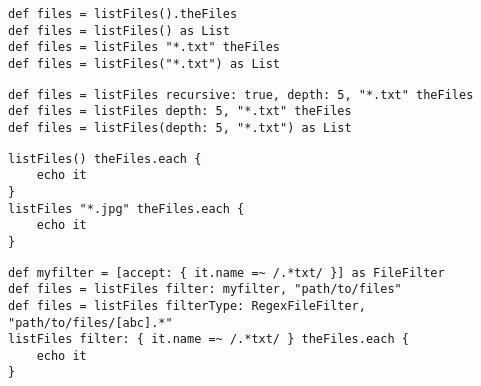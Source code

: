 \begin{lstlisting}[style=Groovybash, label={lst:example_listFiles_simple}]
def files = listFiles().theFiles
def files = listFiles() as List
def files = listFiles "*.txt" theFiles
def files = listFiles("*.txt") as List
\end{lstlisting}

\begin{lstlisting}[style=Groovybash, label={lst:example_listFiles_arguments}]
def files = listFiles recursive: true, depth: 5, "*.txt" theFiles
def files = listFiles depth: 5, "*.txt" theFiles
def files = listFiles(depth: 5, "*.txt") as List
\end{lstlisting}

\begin{lstlisting}[style=Groovybash, label={lst:example_listFiles_iterate}]
listFiles() theFiles.each {
    echo it
}
listFiles "*.jpg" theFiles.each {
    echo it
}
\end{lstlisting}

\begin{lstlisting}[style=Groovybash, label={lst:example_listFiles_filter}]
def myfilter = [accept: { it.name =~ /.*txt/ }] as FileFilter
def files = listFiles filter: myfilter, "path/to/files"
def files = listFiles filterType: RegexFileFilter, "path/to/files/[abc].*"
listFiles filter: { it.name =~ /.*txt/ } theFiles.each {
    echo it
}
\end{lstlisting}

